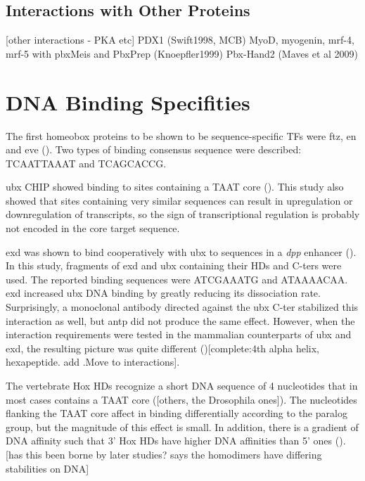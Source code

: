 \subsection{Interactions with Other Proteins}
[other interactions - PKA etc]
PDX1 (Swift1998, MCB)
MyoD, myogenin, mrf-4, mrf-5 with pbxMeis and PbxPrep (Knoepfler1999)
Pbx-Hand2 (Maves et al 2009)


\section{DNA Binding Specifities}
\label{sec:specificites}
		
The first homeobox proteins to be shown to be sequence-specific \acp{TF} were \ac{ftz}, \ac{en} and \ac{eve} (\cite{Desplan1988,Hoey1988,Hoey1988a}). Two types of binding consensus sequence were described: TCAATTAAAT and TCAGCACCG.
		
\ac{ubx} \ac{CHIP} showed binding to sites containing a TAAT core (\cite{Gould1990}). This study also showed that sites containing very similar sequences can result in upregulation or downregulation of transcripts, so the sign of transcriptional regulation is probably not encoded in the core target sequence.


\ac{exd} was shown to bind cooperatively with \ac{ubx} to sequences in a \textit{dpp} enhancer (\cite{Chan1994}). In this study, fragments of \ac{exd} and \ac{ubx} containing their \acp{HD} and \acp{C-ter} were used. The reported binding sequences were ATCGAAATG and ATAAAACAA. \ac{exd} increased \ac{ubx} DNA binding by greatly reducing its dissociation rate. Surprisingly, a monoclonal antibody directed against the \ac{ubx} \ac{C-ter} stabilized this interaction as well, but \ac{antp} did not produce the same effect. However, when the interaction requirements were tested in the mammalian counterparts of \ac{ubx} and \ac{exd}, the resulting picture was quite different (\cite{Chang1995})[complete:4th alpha helix, hexapeptide. add \cite{Lu1996}.Move to interactions].

The vertebrate Hox \acp{HD} recognize a short DNA sequence of 4 nucleotides that in most cases contains a TAAT core (\cite{Treisman1992,Catron1993}[others, the Drosophila ones]). The nucleotides flanking the TAAT core affect in binding differentially according to the paralog group, but the magnitude of this effect is small. In addition, there is a gradient of DNA affinity such that 3' Hox \acp{HD} have higher DNA affinities than 5' ones (\cite{Pellerin1994}). [has this been borne by later studies? \cite{Shen1997a} says the homodimers have differing stabilities on DNA]

